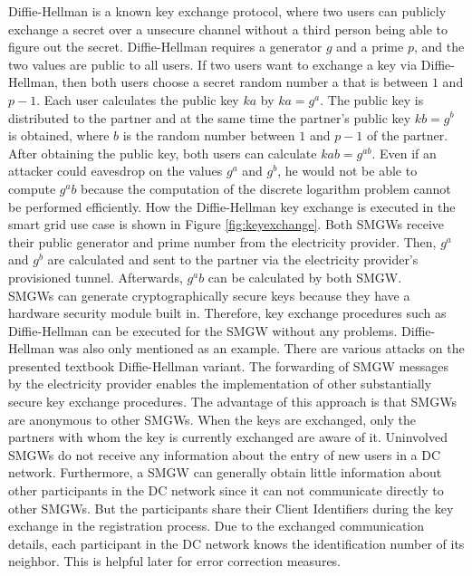 Diffie-Hellman is a known key exchange protocol, where two users can publicly exchange a secret over a unsecure channel without a third person being able to figure out the secret. 
Diffie-Hellman requires a generator $g$ and a prime $p$, and the two values are public to all users. If two users want to exchange a key via Diffie-Hellman, then both users choose a secret random number a that is between $1$ and $p-1$. Each user calculates the public key $ka$ by $ka=g^a$. The public key is distributed to the partner and at the same time the partner's public key $kb=g^b$ is obtained, where $b$ is the random number between $1$ and $p-1$ of the partner. After obtaining the public key, both users can calculate $kab=g^{ab}$.%
Even if an attacker could eavesdrop on the values $g^a$ and $g^b$, he would not be able to compute $g^ab$ because the computation of the discrete logarithm problem cannot be performed efficiently. How the Diffie-Hellman key exchange is executed in the smart grid use case is shown in Figure \ref{fig:keyexchange}. 
Both \gls{SMGW}s receive their public generator and prime number from the electricity provider. Then, $g^a$ and $g^b$ are calculated and sent to the partner via the electricity provider's provisioned tunnel. Afterwards, $g^ab$ can be calculated by both \gls{SMGW}.\\
\gls{SMGW}s can generate cryptographically secure keys because they have a hardware security module built in. Therefore, key exchange procedures such as Diffie-Hellman can be executed for the \gls{SMGW} without any problems. Diffie-Hellman was also only mentioned as an example. There are various attacks on the presented textbook Diffie-Hellman variant.
The forwarding of \gls{SMGW} messages by the electricity provider enables the implementation of other substantially secure key exchange procedures. The advantage of this approach is that \gls{SMGW}s are anonymous to other \gls{SMGW}s. When the keys are exchanged, only the partners with whom the key is currently exchanged are aware of it. Uninvolved \gls{SMGW}s do not receive any information about the entry of new users in a DC network. Furthermore, a \gls{SMGW} can generally obtain little information about other participants in the DC network since it can not communicate directly to other \gls{SMGW}s. But the participants share their Client Identifiers during the key exchange in the registration process. Due to the exchanged communication details, each participant in the DC network knows the identification number of its neighbor. This is helpful later for error correction measures. %

